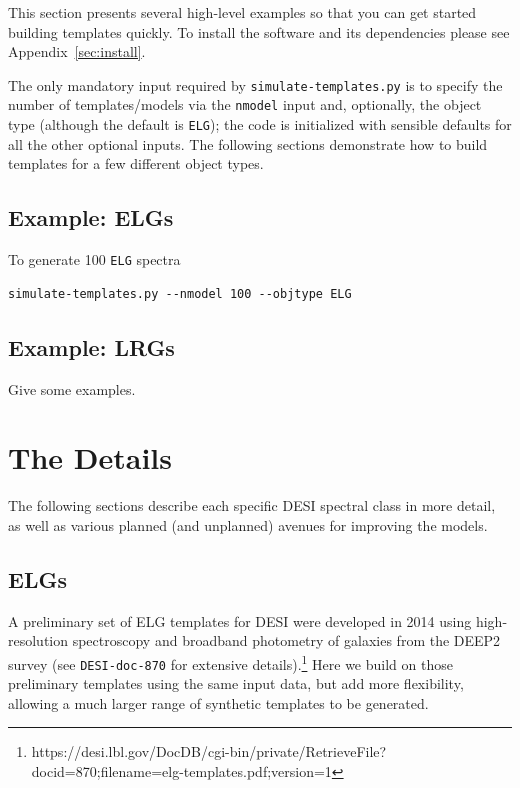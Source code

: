 \documentclass[11pt]{article}
\newcommand{\simt}{{\tt simulate-templates.py}}
\begin{document}
This section presents several high-level examples so that you can get started
building templates quickly.  To install the software and its dependencies please
see Appendix~\ref{sec:install}.

The only mandatory input required by \simt{} is to specify the number of
templates/models via the {\tt nmodel} input and, optionally, the object type
(although the default is {\tt ELG}); the code is initialized with sensible
defaults for all the other optional inputs.  The following sections demonstrate
how to build templates for a few different object types.

\subsection{Example: ELGs}

To generate 100 {\tt ELG} spectra 

\begin{verbatim}
simulate-templates.py --nmodel 100 --objtype ELG
\end{verbatim}

\subsection{Example: LRGs}

Give some examples.

\section{The Details}

The following sections describe each specific DESI spectral class in more
detail, as well as various planned (and unplanned) avenues for improving the
models.


\subsection{ELGs}

A preliminary set of ELG templates for DESI were developed in 2014 using
high-resolution spectroscopy and broadband photometry of galaxies from the DEEP2
survey (see {\tt DESI-doc-870} for extensive
details).\footnote{https://desi.lbl.gov/DocDB/cgi-bin/private/RetrieveFile?docid=870;filename=elg-templates.pdf;version=1}
Here we build on those preliminary templates using the same input data, but add
more flexibility, allowing a much larger range of synthetic templates to be
generated.
\end{document}
